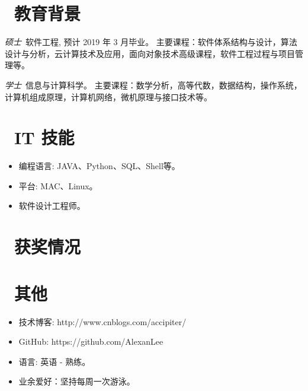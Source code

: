 \documentclass{resume}
\begin{document}
\section{\faGraduationCap\  教育背景}
\textit{硕士}\ 软件工程, 预计 2019 年 3 月毕业。
 主要课程：软件体系结构与设计，算法设计与分析，云计算技术及应用，面向对象技术高级课程，软件工程过程与项目管理等。

\textit{学士}\ 信息与计算科学。
 主要课程：数学分析，高等代数，数据结构，操作系统，计算机组成原理，计算机网络，微机原理与接口技术等。



\section{\faCogs\ IT 技能}
\begin{itemize}[parsep=0.5ex]
  \item 编程语言: JAVA、Python、SQL、Shell等。
  \item 平台: MAC、Linux。
  \item 软件设计工程师。
\end{itemize}

\section{\faHeartO\ 获奖情况}

\section{\faInfo\ 其他}
\begin{itemize}[parsep=0.5ex]
  \item 技术博客: http://www.cnblogs.com/accipiter/
  \item GitHub: https://github.com/AlexanLee
  \item 语言: 英语 - 熟练。
  \item 业余爱好：坚持每周一次游泳。
\end{itemize}

%
%
\end{document}
